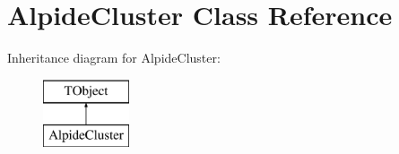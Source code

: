 \hypertarget{class_alpide_cluster}{}\section{Alpide\+Cluster Class Reference}
\label{class_alpide_cluster}
Inheritance diagram for Alpide\+Cluster\+:\begin{figure}[H]
\begin{center}
\leavevmode
\includegraphics[height=2.000000cm]{class_alpide_cluster}
\end{center}
\end{figure}

